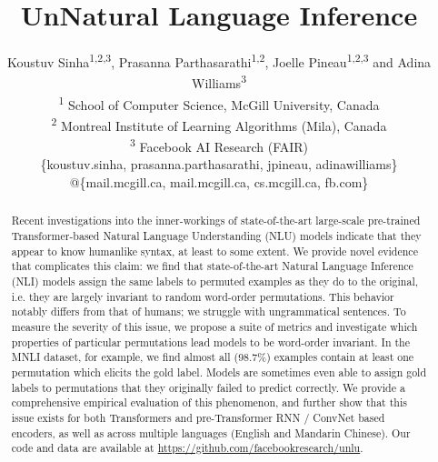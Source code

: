 \documentclass[11pt,a4paper]{article}
\title{UnNatural Language Inference}
\author{Koustuv Sinha\textsuperscript{1,2,3},
  Prasanna Parthasarathi\textsuperscript{1,2},
  Joelle Pineau\textsuperscript{1,2,3} and
  Adina Williams\textsuperscript{3} \\
  \textsuperscript{1} School of Computer Science, McGill University, Canada \\
  \textsuperscript{2} Montreal Institute of Learning Algorithms (Mila), Canada \\
  \textsuperscript{3} Facebook AI Research (FAIR)\\
  \{koustuv.sinha, prasanna.parthasarathi, jpineau, adinawilliams\}\\@\{mail.mcgill.ca, mail.mcgill.ca, cs.mcgill.ca, fb.com\}}
\date{}
\begin{document}
\maketitle
\begin{abstract}
Recent investigations into the inner-workings of state-of-the-art large-scale pre-trained Transformer-based Natural Language Understanding (NLU) models indicate that they appear to know humanlike syntax, at least to some extent. We provide novel evidence that complicates this claim: we find that state-of-the-art Natural Language Inference (NLI) models assign the same labels to permuted examples as they do to the original, i.e. they are largely invariant to random word-order permutations. This behavior notably differs from that of humans; we struggle with ungrammatical sentences. To measure the severity of this issue, we propose a suite of metrics and investigate which properties of particular permutations lead models to be word-order invariant. In the MNLI dataset, for example, we find almost all (98.7\%) examples contain at least one permutation which elicits the gold label. Models are sometimes even able to assign gold labels to permutations that they originally failed to predict correctly. We provide a comprehensive empirical evaluation of this phenomenon, and further show that this issue exists for both Transformers and pre-Transformer RNN / ConvNet based encoders, as well as across multiple languages (English and Mandarin Chinese). Our code and data are available at \href{https://github.com/facebookresearch/unlu}{https://github.com/facebookresearch/unlu}. 
\end{abstract}
\end{document}
